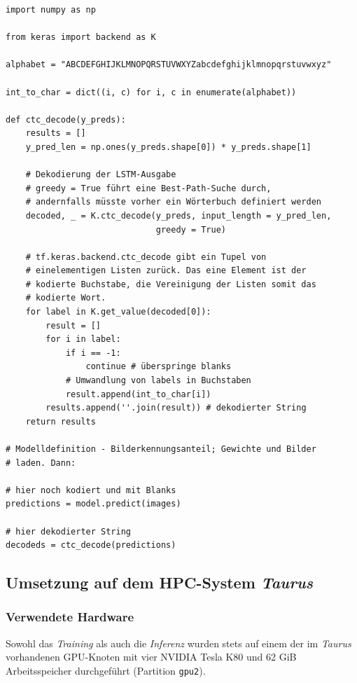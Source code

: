 \begin{code}
\begin{verbatim}
import numpy as np

from keras import backend as K

alphabet = "ABCDEFGHIJKLMNOPQRSTUVWXYZabcdefghijklmnopqrstuvwxyz"

int_to_char = dict((i, c) for i, c in enumerate(alphabet))

def ctc_decode(y_preds):
    results = []
    y_pred_len = np.ones(y_preds.shape[0]) * y_preds.shape[1]

    # Dekodierung der LSTM-Ausgabe
    # greedy = True führt eine Best-Path-Suche durch,
    # andernfalls müsste vorher ein Wörterbuch definiert werden
    decoded, _ = K.ctc_decode(y_preds, input_length = y_pred_len,
                              greedy = True)

    # tf.keras.backend.ctc_decode gibt ein Tupel von
    # einelementigen Listen zurück. Das eine Element ist der
    # kodierte Buchstabe, die Vereinigung der Listen somit das
    # kodierte Wort.
    for label in K.get_value(decoded[0]):
        result = []
        for i in label:
            if i == -1:
                continue # überspringe blanks
            # Umwandlung von labels in Buchstaben
            result.append(int_to_char[i])
        results.append(''.join(result)) # dekodierter String
    return results

# Modelldefinition - Bilderkennungsanteil; Gewichte und Bilder
# laden. Dann:

# hier noch kodiert und mit Blanks
predictions = model.predict(images)

# hier dekodierter String
decodeds = ctc_decode(predictions)
\end{verbatim}
\label{daten:textklassifizierung:inferenz}
\end{code}

\subsection{Umsetzung auf dem HPC-System \textit{Taurus}}
\label{daten:taurus}

\subsubsection{Verwendete Hardware}
\label{daten:taurus:hardware}

Sowohl das \textit{Training} als auch die \textit{Inferenz} wurden stets auf einem der im \textit{Taurus} vorhandenen
GPU-Knoten mit vier NVIDIA Tesla K80 und 62 GiB Arbeitsspeicher durchgeführt (Partition \texttt{gpu2}).

